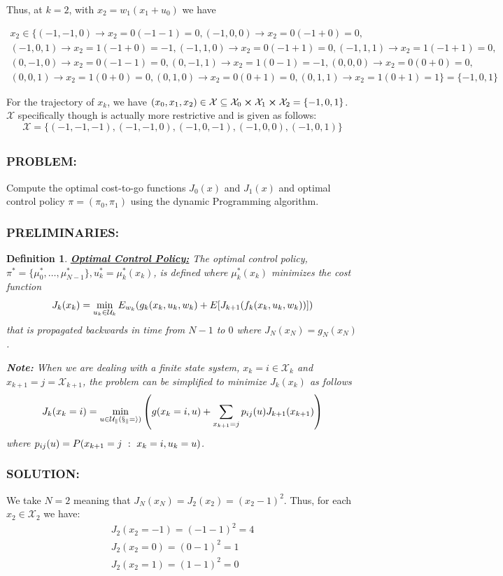 \documentclass[]{article}
\newcommand{\Problem}{\subsubsection*{\textbf{PROBLEM:}}}
\newcommand{\Solution}{\subsubsection*{\textbf{SOLUTION:}}}
\newcommand{\Preliminaries}{\subsubsection*{\textbf{PRELIMINARIES:}}}
\newcommand{\st}{\ : \ }
\newtheorem{definition}{Definition}
\begin{document}
Thus, at $k=2$, with $x_2 = w_1(x_1 + u_0)$ we have

\begin{multline}
    x_2 \in \{
        (-1,-1,0) \to x_2 = 0(-1-1) = 0, 
        (-1,0,0) \to x_2 = 0(-1+0) = 0,\\
        (-1,0,1) \to x_2 = 1(-1+0) = -1,
        (-1,1,0) \to x_2 = 0(-1+1) = 0,
        (-1,1,1) \to x_2 = 1(-1+1) = 0,\\
        (0,-1,0) \to x_2 = 0(-1-1) = 0, 
        (0,-1,1) \to x_2 = 1(0-1) = -1,
        (0,0,0) \to x_2 = 0(0+0) = 0,\\
        (0,0,1) \to x_2 = 1(0+0) = 0,
        (0,1,0) \to x_2 = 0(0+1) = 0,
        (0,1,1) \to x_2 = 1(0+1) = 1
    \} = \{-1,0,1\}
\end{multline}

For the trajectory of $x_k$, we have $(x_0,x_1,x_2) \in \mathcal{X} \subseteq \mathcal{X}_0 \cross \mathcal{X}_1 \cross \mathcal{X}_2 = \{-1, 0, 1\}$.
$\mathcal{X}$ specifically though is actually more restrictive and is given as follows:\[
    \mathcal{X} = \{
        (-1, -1, -1),
        (-1, -1, 0),
        (-1, 0, -1),
        (-1, 0, 0),
        (-1, 0, 1)
    \}
\]

\subsection{}
\Problem
Compute the optimal cost-to-go functions $J_0(x)$ and $J_1(x)$ and optimal control policy $\pi = (\pi_0,\pi_1)$ using the dynamic Programming algorithm.
\Preliminaries
\begin{definition}
    \underline{\textbf{\emph{Optimal Control Policy:}}}
    The optimal control policy, $\pi^* = \{\mu_0^*, \dots, \mu_{N-1}^*\}, u_k^* = \mu_k^*(x_k)$, is defined where $\mu_k^*(x_k)$ minimizes the cost function \[
        J_k(x_k) = \min_{u_k \in \mathcal{U}_k} E_{w_k} \qty(g_k(x_k,u_k,w_k) + E[J_{k+1}(f_k(x_k,u_k,w_k))])
    \] that is propagated backwards in time from $N-1$ to $0$ where $J_N(x_N) = g_N(x_N)$.

    \textbf{Note:}
    When we are dealing with a finite state system, $x_k = i \in \mathcal{X}_k$ and $x_{k+1}=j = \mathcal{X}_{k+1}$, the problem can be simplified to minimize $J_k(x_k)$ as follows\[
        J_k(x_k=i) = \min_{u \in \mathcal{U_k(x_k=i)}} \qty(
            g(x_k=i, u) + \sum_{x_{k+1}=j} p_{ij}(u) J_{k+1}(x_{k+1})
        )
    \] where $p_{ij}(u) = P\qty(x_{k+1} = j \st x_k = i, u_k = u)$.
\end{definition}
\Solution
We take $N=2$ meaning that $J_N(x_N) = J_2(x_2) = (x_2 -1)^2$.
Thus, for each $x_2 \in \mathcal{X}_2$ we have: 
\[\begin{aligned}
    J_2(x_2 = -1) = (-1-1)^2 = 4\\
    J_2(x_2 = 0) = (0-1)^2 = 1\\
    J_2(x_2 = 1) = (1-1)^2 = 0
\end{aligned}\]
\end{document}
